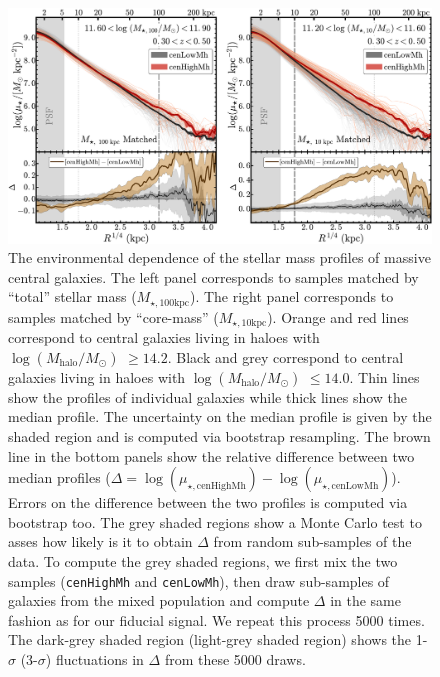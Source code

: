 \documentclass[a4paper,fleqn,usenatbib]{mnras}
\def\rbcg{\texttt{cenHighMh}}
\def\nbcg{\texttt{cenLowMh}}
\def\logmh{{$\log (M_{\mathrm{halo}}/M_{\odot})$}}
\def\minn{{$M_{\star,10\mathrm{kpc}}$}}
\def\mtot{{$M_{\star,100\mathrm{kpc}}$}}
\begin{document}
  \begin{figure}
      \centering 
      \includegraphics[width=\textwidth]{fig/redbcg_prof_1}
      \caption{
          The environmental dependence of the stellar mass profiles of massive central 
          galaxies. 
          The left panel corresponds to samples matched by ``total'' stellar mass 
          (\mtot{}). 
          The right panel corresponds to samples matched by ``core-mass'' (\minn{}). 
          Orange and red lines correspond to central galaxies living in haloes with 
          \logmh{} $\geq 14.2$. 
          Black and grey correspond to central galaxies living in haloes with 
          \logmh{} $\leq 14.0$. 
          Thin lines show the profiles of individual galaxies while thick lines show 
          the median profile. 
          The uncertainty on the median profile is given by the shaded region and is 
          computed via bootstrap resampling. 
          The brown line in the bottom panels show the relative difference between 
          two median profiles 
          ($\Delta = \log(\mu_{\star, \mathrm{cenHighMh}}) - 
          \log(\mu_{\star, \mathrm{cenLowMh}})$). 
          Errors on the difference between the two profiles is computed via bootstrap 
          too. 
          The grey shaded regions show a Monte Carlo test to asses how likely is it to 
          obtain $\Delta$ from random sub-samples of the data. 
          To compute the grey shaded regions, we first mix the two samples 
          (\rbcg{} and \nbcg{}), then draw sub-samples of galaxies from the mixed 
          population and compute $\Delta$ in the same fashion as for our fiducial signal. 
          We repeat this process 5000 times.  
          The dark-grey shaded region (light-grey shaded region) shows the 1-$\sigma$ 
          (3-$\sigma$) fluctuations in $\Delta$ from these 5000 draws.
          }
      \label{fig:prof_1} 
  \end{figure}
\end{document}
